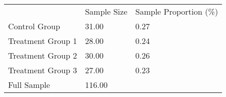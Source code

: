 \documentclass{article}
\begin{document}
\begin{table}[!h]
\centering
\begin{tabular}{lll}
\cline{1-3}
\multicolumn{1}{|l}{} &
  \multicolumn{1}{|l}{Sample Size} &
  \multicolumn{1}{|l|}{Sample Proportion (\%)} \\
\cline{1-3}
\multicolumn{1}{|l}{Control Group} &
  \multicolumn{1}{|l}{31.00} &
  \multicolumn{1}{|l|}{0.27} \\
\cline{1-3}
\multicolumn{1}{|l}{Treatment Group 1} &
  \multicolumn{1}{|l}{28.00} &
  \multicolumn{1}{|l|}{0.24} \\
\cline{1-3}
\multicolumn{1}{|l}{Treatment Group 2} &
  \multicolumn{1}{|l}{30.00} &
  \multicolumn{1}{|l|}{0.26} \\
\cline{1-3}
\multicolumn{1}{|l}{Treatment Group 3} &
  \multicolumn{1}{|l}{27.00} &
  \multicolumn{1}{|l|}{0.23} \\
\cline{1-3}
\multicolumn{1}{|l}{Full Sample} &
  \multicolumn{1}{|l}{116.00} &
  \multicolumn{1}{|l|}{} \\
\cline{1-3}
\end{tabular}
\end{table}
\end{document}
